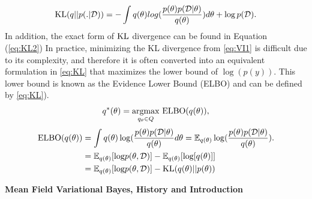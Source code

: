 \begin{equation}
	\label{eq:KL2}
	\textnormal{KL}(q||p(.|\mathcal{D})) = - \int q(\theta)log(\frac{p(\theta)p(\mathcal{D}|\theta)}{q(\theta)}) d\theta + \log p(\mathcal{D}).
\end{equation}
In addition, the exact form of $\textnormal{KL}$ divergence can be found in Equation (\ref{eq:KL2})
In practice, minimizing the KL divergence from \autoref{eq:VI1} is difficult due to its complexity, and therefore it is often converted into an equivalent formulation in \autoref{eq:KL} that maximizes the lower bound of $\log(p(y))$. This lower bound is known as the Evidence Lower Bound (ELBO) and can be defined by \autoref{eq:KL}).
\begin{equation}
	\label{eq:KL}
	q^*(\theta) = \underset{q_{\theta} \in Q}{\operatorname{ argmax}} \textnormal{ ELBO}(q(\theta)),
\end{equation}
\begin{equation}
	\label{eq:ELBO}	
	\begin{aligned}
		\textnormal{ELBO}(q(\theta)) &= \int q(\theta)\log(\frac{p(\theta)p(\mathcal{D}|\theta)}{q(\theta)}d\theta = \mathop{\mathbb{E}_{q(\theta)}}\log(\frac{p(\theta)p(\mathcal{D}|\theta)}{q(\theta)}).\\
		& = \mathop{\mathbb{E}_{q(\theta)}}[\textnormal{log}p(\theta,\mathcal{D})]
		- \mathop{\mathbb{E}_{q(\theta)}}[\textnormal{log}[q(\theta)]]\\
		&= \mathop{\mathbb{E}_{q(\theta)}}[\textnormal{log}p(\theta,\mathcal{D})]
		- \textnormal{KL}(q(\theta)||p(\theta))\\
	\end{aligned}
\end{equation}

\textbf{Mean Field Variational Bayes, History and Introduction}

